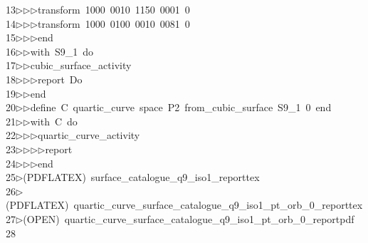\begin{tabbing}
13\>$\triangleright$\>$\triangleright$\>$\triangleright$\>transform\ 1000\ 0010\ 1150\ 0001\ 0\ \\[0pt]
14\>$\triangleright$\>$\triangleright$\>$\triangleright$\>transform\ 1000\ 0100\ 0010\ 0081\ 0\ \\[0pt]
15\>$\triangleright$\>$\triangleright$\>$\triangleright$\>end\ \\[0pt]
16\>$\triangleright$\>$\triangleright$\>with\ S9\_1\ do\ \\[0pt]
17\>$\triangleright$\>$\triangleright$\>cubic\_surface\_activity\ \\[0pt]
18\>$\triangleright$\>$\triangleright$\>$\triangleright$\>report\ Do\ \\[0pt]
19\>$\triangleright$\>$\triangleright$\>end\ \\[0pt]
20\>$\triangleright$\>$\triangleright$\>define\ C\ quartic\_curve\ space\ P2\ from\_cubic\_surface\ S9\_1\ 0\ end\ \\[0pt]
21\>$\triangleright$\>$\triangleright$\>with\ C\ do\ \\[0pt]
22\>$\triangleright$\>$\triangleright$\>$\triangleright$\>quartic\_curve\_activity\ \\[0pt]
23\>$\triangleright$\>$\triangleright$\>$\triangleright$\>$\triangleright$\>report\ \\[0pt]
24\>$\triangleright$\>$\triangleright$\>$\triangleright$\>end\\[0pt]
25\>$\triangleright$\>(PDFLATEX)\ surface\_catalogue\_q9\_iso1\_reporttex\\[0pt]
26\>$\triangleright$\>(PDFLATEX)\ quartic\_curve\_surface\_catalogue\_q9\_iso1\_pt\_orb\_0\_reporttex\\[0pt]
27\>$\triangleright$\>(OPEN)\ quartic\_curve\_surface\_catalogue\_q9\_iso1\_pt\_orb\_0\_reportpdf\\[0pt]
28\>\end{tabbing}
